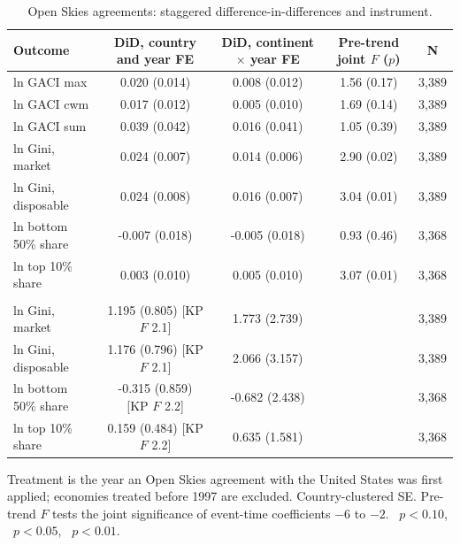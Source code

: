 \begin{table}[H]\centering\caption{Open Skies agreements: staggered difference-in-differences and instrument.}\label{tab:openskies}
\begin{threeparttable}\small\begin{tabular}{lcccc}
\toprule
Outcome & DiD, country and year FE & DiD, continent $\times$ year FE & Pre-trend joint $F$ ($p$) & N \\
\midrule
ln GACI max & 0.020 (0.014) & 0.008 (0.012) & 1.56 (0.17) & 3,389 \\
ln GACI cwm & 0.017 (0.012) & 0.005 (0.010) & 1.69 (0.14) & 3,389 \\
ln GACI sum & 0.039 (0.042) & 0.016 (0.041) & 1.05 (0.39) & 3,389 \\
ln Gini, market & 0.024\sym{***} (0.007) & 0.014\sym{**} (0.006) & 2.90 (0.02) & 3,389 \\
ln Gini, disposable & 0.024\sym{***} (0.008) & 0.016\sym{**} (0.007) & 3.04 (0.01) & 3,389 \\
ln bottom 50\% share & -0.007 (0.018) & -0.005 (0.018) & 0.93 (0.46) & 3,368 \\
ln top 10\% share & 0.003 (0.010) & 0.005 (0.010) & 3.07 (0.01) & 3,368 \\
\addlinespace\multicolumn{5}{l}{\emph{Open Skies as instrument for ln GACI max (2SLS, clustered SE)}}\\
ln Gini, market & 1.195 (0.805) [KP $F$ 2.1] & 1.773 (2.739) & & 3,389 \\
ln Gini, disposable & 1.176 (0.796) [KP $F$ 2.1] & 2.066 (3.157) & & 3,389 \\
ln bottom 50\% share & -0.315 (0.859) [KP $F$ 2.2] & -0.682 (2.438) & & 3,368 \\
ln top 10\% share & 0.159 (0.484) [KP $F$ 2.2] & 0.635 (1.581) & & 3,368 \\
\bottomrule
\end{tabular}
\begin{tablenotes}\footnotesize\item Treatment is the year an Open Skies agreement with the United States was first applied; economies treated before 1997 are excluded. Country-clustered SE. Pre-trend $F$ tests the joint significance of event-time coefficients $-6$ to $-2$. \sym{*}~$p<0.10$, \sym{**}~$p<0.05$, \sym{***}~$p<0.01$.\end{tablenotes}\end{threeparttable}\end{table}

